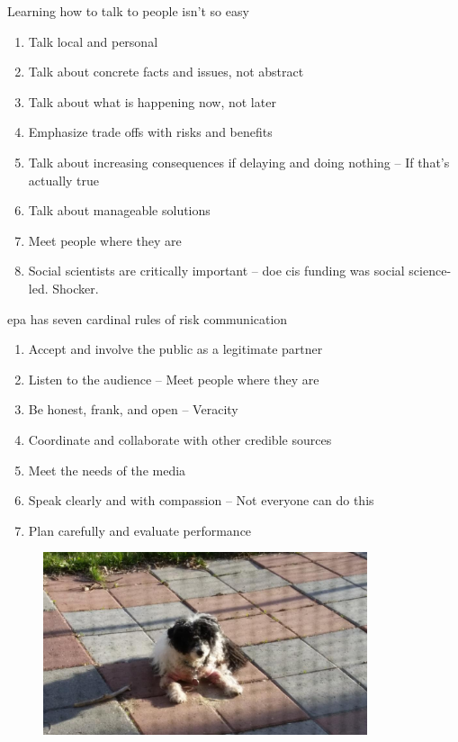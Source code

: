 \documentclass[aspectratio=1610,pdftex,dvipsnames,compress,xcolor={dvipsnames}]{beamer}
\newcommand{\acs}{\acrshort} %
\begin{document}
\begin{frame}{Learning how to talk to people isn't so easy}
    \begin{enumerate}[series=outerlist,topsep=0pt,itemsep=15pt,leftmargin=*,label=(\arabic*)]
        \item[]Talk local and personal
        \item[]Talk about concrete facts and issues, not abstract
        \item[]Talk about what is happening now, not later  
        \item[]Emphasize trade offs with risks and benefits
        \item[]Talk about increasing consequences if delaying and doing nothing -- If that's actually true
        \item[]Talk about manageable solutions
        \item[]Meet people where they are
        \item[]Social scientists are critically important -- \acs{doe} \acs{cis} funding was social science-led. Shocker.
    \end{enumerate}
\end{frame}


\begin{frame}{\acs{epa} has seven cardinal rules of risk communication}
    \begin{enumerate}[series=outerlist,topsep=0pt,itemsep=15pt,leftmargin=*,label=(\arabic*)]
        \item[]Accept and involve the public as a legitimate partner
        \item[]Listen to the audience -- Meet people where they are 
        \item[]Be honest, frank, and open -- Veracity 
        \item[]Coordinate and collaborate with other credible sources
        \item[]Meet the needs of the media
        \item[]Speak clearly and with compassion -- Not everyone can do this
        \item[]Plan carefully and evaluate performance
    \end{enumerate}
\end{frame}


\begin{frame}[plain]{}
    \begin{figure}
        \centering
        \includegraphics[width=0.85\textwidth]{final.jpg}
    \end{figure}
\end{frame}
\end{document}
